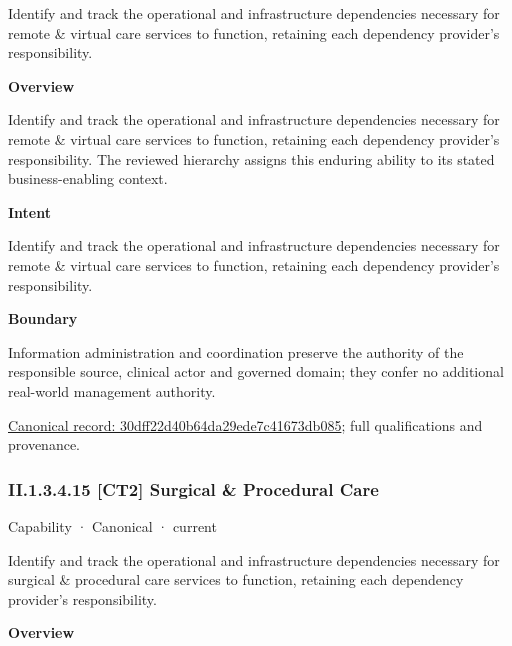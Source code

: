 Identify and track the operational and infrastructure dependencies necessary for remote \& virtual care services to function, retaining each dependency provider's responsibility.



\textbf{Overview}



Identify and track the operational and infrastructure dependencies necessary for remote \& virtual care services to function, retaining each dependency provider's responsibility. The reviewed hierarchy assigns this enduring ability to its stated business-enabling context.



\textbf{Intent}



Identify and track the operational and infrastructure dependencies necessary for remote \& virtual care services to function, retaining each dependency provider's responsibility.



\textbf{Boundary}



Information administration and coordination preserve the authority of the responsible source, clinical actor and governed domain; they confer no additional real-world management authority.


{\footnotesize \href{../../../../continuum/strategy/capability/30dff22d40b64da29ede7c41673db085.md}{Canonical record: 30dff22d40b64da29ede7c41673db085}; full qualifications and provenance.}\par
\subsubsection*{II.1.3.4.15 [CT2] Surgical \& Procedural Care}
\label{navigation:II.1.3.4.15}

\label{element:c9a26d1aa1014545b9ae759b663c807b}
{\small Capability · Canonical · current}\par

Identify and track the operational and infrastructure dependencies necessary for surgical \& procedural care services to function, retaining each dependency provider's responsibility.



\textbf{Overview}



